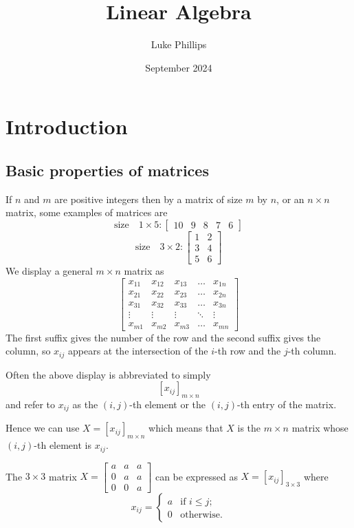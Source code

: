 \documentclass[10pt, a4paper]{article}
\title{Linear Algebra}
\author{Luke Phillips}
\date{September 2024}
\begin{document}
\maketitle

\newpage

\tableofcontents

\newpage

\section{Introduction}

\subsection{Basic properties of matrices}

If $n$ and $m$ are positive integers then by a matrix of size $m$ by $n$, or an $n \times n$ matrix, some examples of matrices are
\[
\text{size}\quad 1\times 5 : \begin{bmatrix} 10 & 9 & 8 & 7 & 6 \end{bmatrix}
\]
\[
\text{size}\quad 3\times 2 : \begin{bmatrix} 1 & 2 \\ 3 & 4 \\ 5 & 6 \end{bmatrix}
\]
We display a general $m \times n$ matrix as
\[
\begin{bmatrix}
    x_{11} & x_{12} & x_{13} & \dots & x_{1n} \\
    x_{21} & x_{22} & x_{23} & \dots & x_{2n} \\
    x_{31} & x_{32} & x_{33} & \dots & x_{3n} \\
    \vdots & \vdots & \vdots & \ddots & \vdots \\
    x_{m1} & x_{m2} & x_{m3} & \dots & x_{mn}
\end{bmatrix}
\]
The first suffix gives the number of the row and the second suffix gives the column, so $x_{ij}$ appears at the intersection of the $i$-th row and the $j$-th column. 

Often the above display is abbreviated to simply
\[
[x_{ij}]_{m\times n}
\]
and refer to $x_{ij}$ as the $(i, j)$-th element or the $(i, j)$-th entry of the matrix.

Hence we can use $X = [x_{ij}]_{m\times n}$ which means that $X$ is the $m\times n$ matrix whose $(i, j)$-th element is $x_{ij}$.

\begin{example}
    The $3\times 3$ matrix $X = \begin{bmatrix} a & a & a \\ 0 & a & a \\ 0 & 0 & a \end{bmatrix}$ can be expressed as $X = [x_{ij}]_{3\times 3}$ where
    \[
    x_{ij} = 
    \begin{cases}
        a & \text{if } i \leq j; \\
        0 & \text{otherwise}.
    \end{cases}
    \]
\end{example}
\end{document}
